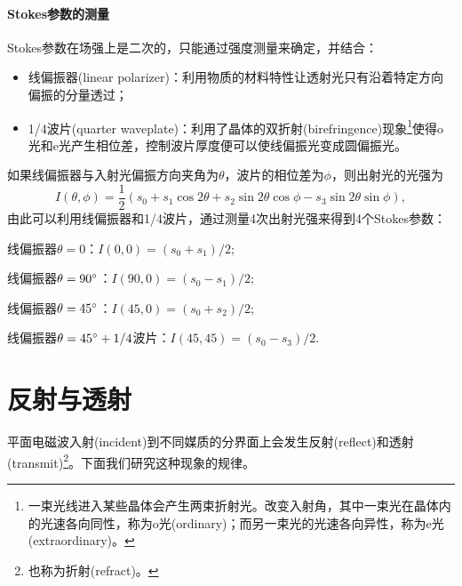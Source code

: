 \paragraph{Stokes参数的测量}
Stokes参数在场强上是二次的，只能通过强度测量来确定，并结合：
\begin{itemize}
    \item 线偏振器(linear polarizer)：利用物质的材料特性让透射光只有沿着特定方向偏振的分量透过；
    \item 1/4波片(quarter waveplate)：利用了晶体的双折射(birefringence)现象\footnote{一束光线进入某些晶体会产生两束折射光。改变入射角，其中一束光在晶体内的光速各向同性，称为o光(ordinary)；而另一束光的光速各向异性，称为e光(extraordinary)。}使得o光和e光产生相位差，控制波片厚度便可以使线偏振光变成圆偏振光。
\end{itemize}
如果线偏振器与入射光偏振方向夹角为$\theta$，波片的相位差为$\phi$，则出射光的光强为
\[
    I(\theta,\phi)=\frac12(s_0+s_1\cos2\theta+s_2\sin2\theta\cos\phi-s_3\sin2\theta\sin\phi),
\]
由此可以利用线偏振器和1/4波片，通过测量4次出射光强来得到4个Stokes参数：
\begin{compactitem}
	\item 线偏振器$\theta=0$：$I(0,0)=(s_0+s_1)/2;$
    \item 线偏振器$\theta=90^\circ$：$I(90,0)=(s_0-s_1)/2;$
    \item 线偏振器$\theta=45^\circ$：$I(45,0)=(s_0+s_2)/2;$
    \item 线偏振器$\theta=45^\circ+1/4$波片：$I(45,45)=(s_0-s_3)/2.$
\end{compactitem}

\section{反射与透射}

平面电磁波入射(incident)到不同媒质的分界面上会发生反射(reflect)和透射(transmit)\footnote{也称为折射(refract)。}。下面我们研究这种现象的规律。
\begin{center}
\end{center}

